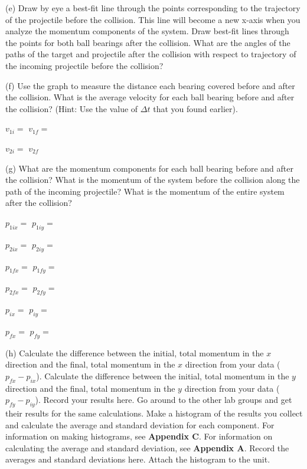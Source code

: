 (e) Draw by eye a best-fit line through the points corresponding to the trajectory
of the projectile before the collision. This line will become a new x-axis when
you analyze the momentum components of the system. Draw best-fit lines through
the points for both ball bearings after the collision. What are the angles of
the paths of the target and projectile after the collision with respect to trajectory
of the incoming projectile before the collision? 
\vspace{10mm}

(f) Use the graph to measure the distance each bearing covered before and after
the collision. What is the average velocity for each ball bearing before and
after the collision? (Hint: Use the value of \( \Delta  t\) that you found
earlier).
\vspace{7mm}

\( v_{1i}= \) \hfill{}\( v_{1f}= \)  \hfill{}
\vspace{7mm}

\( v_{2i} =\)  \hfill{}\( v_{2f} \)  \hfill{}
\vspace{7mm}

(g) What are the momentum components for each ball bearing before and after
the collision? What is the momentum of the system before the collision along
the path of the incoming projectile? What is the momentum of the entire system
after the collision? 
\vspace{7mm}

\( p_{1ix}= \)  \hfill{}\( p_{1iy} =\)  \hfill{}
\vspace{7mm}

\( p_{2ix} =\)  \hfill{}\( p_{2iy}= \) \hfill{} 
\vspace{7mm}

\( p_{1fx} =\)  \hfill{}\( p_{1fy}= \) \hfill{} 
\vspace{7mm}

\( p_{2fx}= \) \hfill{}\( p_{2fy} =\)  \hfill{}
\vspace{7mm}

\( p_{ix} =\)  \hfill{}\( p_{iy}= \) \hfill{} 
\vspace{7mm}

\( p_{fx} =\)  \hfill{}\( p_{fy}= \) \hfill{} 
\vspace{7mm}

(h) Calculate the difference between the initial, total momentum in the $x$ direction and the final, total momentum in the $x$ direction from your data ($p_{fx} - p_{ix}$).
Calculate the difference between the initial, total momentum in the $y$ direction and the final, total momentum in the $y$ direction from your data ($p_{fy} - p_{iy}$).
Record your results here.
Go around to the other lab groups and get their results for the same calculations.
Make a histogram of the results you collect and calculate the average and standard deviation for each component.
For information on making histograms, see \textbf{Appendix C}. For information on calculating the average and
standard deviation, see \textbf{Appendix A}. Record the averages and standard deviations here.
Attach the histogram to the unit.
\vspace{50mm}

